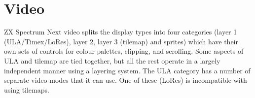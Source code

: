 \chapter{Video}

ZX Spectrum Next video splits the display types into four categories
(layer 1 (ULA/Timex/LoRes), layer 2, layer 3 (tilemap) and sprites)
which have their own sets of controls for colour palettes, clipping,
and scrolling. Some aspects of ULA and tilemap are tied together, but
all the rest operate in a largely independent manner using a layering
system. The ULA category has a number of separate video modes that it
can use. One of these (LoRes) is incompatible with using tilemaps.






